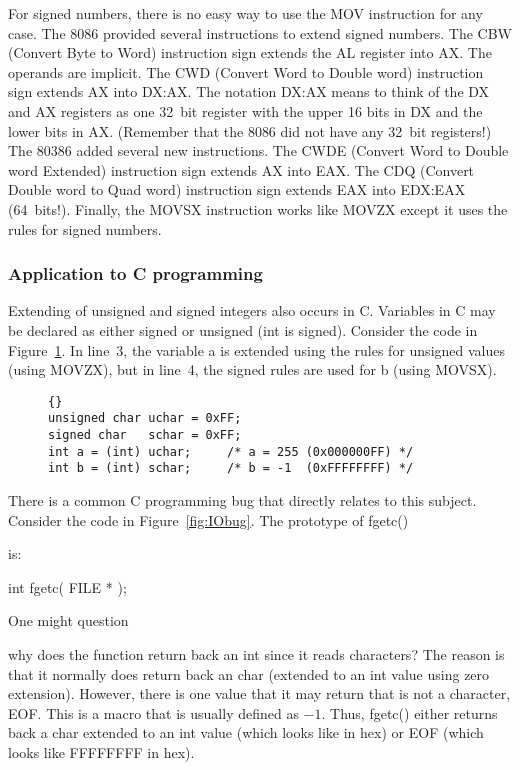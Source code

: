 For signed numbers, there is no easy way to use the {\code MOV}
instruction for any case. The 8086 provided several instructions to
extend signed numbers.  The {\code CBW}  (Convert Byte to
Word) instruction sign extends the AL register into AX. The operands
are implicit. The {\code CWD}  (Convert Word to Double
word) instruction sign extends AX into DX:AX. The notation DX:AX means
to think of the DX and AX registers as one 32~bit register with the
upper 16 bits in DX and the lower bits in AX. (Remember that the 8086
did not have any 32~bit registers!) The 80386 added several new
instructions. The {\code CWDE}  (Convert Word to Double
word Extended) instruction sign extends AX into EAX. The {\code CDQ}
 (Convert Double word to Quad word) instruction sign
extends EAX into EDX:EAX (64~bits!). Finally, the {\code MOVSX}
 instruction works like {\code MOVZX} except it uses the
rules for signed numbers.

\subsubsection{Application to C programming}

Extending  of unsigned and signed integers also occurs
in C. Variables in C may be declared as either signed or unsigned
({\code int} is signed). Consider the code in
Figure~\ref{fig:charExt}.  In line~3, the variable {\code a} is
extended using the rules for unsigned values (using {\code MOVZX}), but in 
line~4, the signed rules are used for {\code b} (using {\code MOVSX}).

\begin{figure}[t]
\begin{lstlisting}[frame=tlrb]{}
unsigned char uchar = 0xFF;
signed char   schar = 0xFF;
int a = (int) uchar;     /* a = 255 (0x000000FF) */
int b = (int) schar;     /* b = -1  (0xFFFFFFFF) */
\end{lstlisting}
\caption{}
\label{fig:charExt}
\end{figure}

There is a common C programming bug that directly relates to this subject.
Consider the code in Figure~\ref{fig:IObug}. The prototype of 
{\code fgetc()}{\samepage is:
\begin{CodeQuote}
int fgetc( FILE * );
\end{CodeQuote}
One might question }why does the function return back an {\code int}
since it reads characters? The reason is that it normally does return
back an {\code char} (extended to an {\code int} value using zero
extension). However, there is one value that it may return that is not
a character, {\code EOF}. This is a macro that is usually defined as
$-1$. Thus, {\code fgetc()} either returns back a {\code char}
extended to an {\code int} value (which looks like {} in hex) or {\code EOF} (which looks like {\code FFFFFFFF} in
hex).

